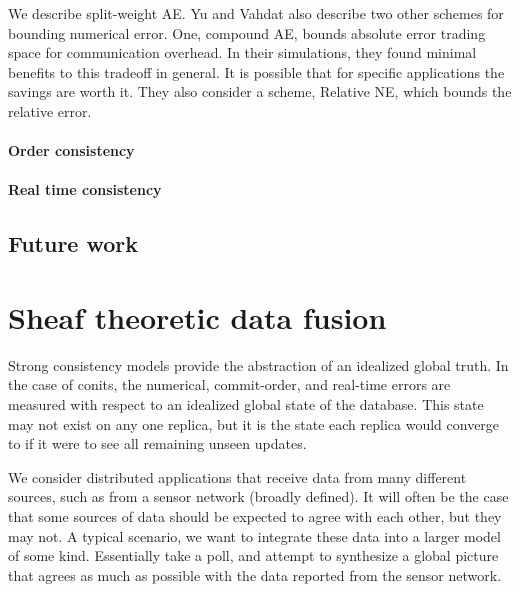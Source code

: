 \documentclass[]             %
{NASA}                       %
\theoremstyle{definition}
\begin{document}
We describe split-weight AE. Yu and Vahdat also describe two other
schemes for bounding numerical error. One, compound AE, bounds absolute
error trading space for communication overhead. In their simulations,
they found minimal benefits to this tradeoff in general. It is possible
that for specific applications the savings are worth it. They also
consider a scheme, Relative NE, which bounds the relative error.

\hypertarget{order-consistency-1}{%
\paragraph{Order consistency}\label{order-consistency-1}}

\hypertarget{real-time-consistency-1}{%
\paragraph{Real time consistency}\label{real-time-consistency-1}}

\hypertarget{future-work}{%
\subsection{Future work}\label{future-work}}

\hypertarget{sheaf-theoretic-data-fusion}{%
\section{Sheaf theoretic data
fusion}\label{sheaf-theoretic-data-fusion}}

\label{sec:sheaf}

Strong consistency models provide the abstraction of an idealized global
truth. In the case of conits, the numerical, commit-order, and real-time
errors are measured with respect to an idealized global state of the
database. This state may not exist on any one replica, but it is the
state each replica would converge to if it were to see all remaining
unseen updates.

We consider distributed applications that receive data from many
different sources, such as from a sensor network (broadly defined). It
will often be the case that some sources of data should be expected to
agree with each other, but they may not. A typical scenario, we want to
integrate these data into a larger model of some kind. Essentially take
a poll, and attempt to synthesize a global picture that agrees as much
as possible with the data reported from the sensor network.
\end{document}
